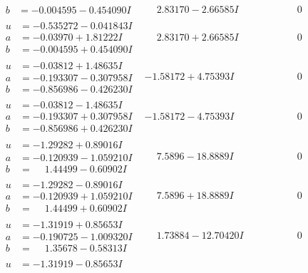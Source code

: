 \documentclass[1p]{elsarticle_modified}
\theoremstyle{definition}
\begin{document}
$$\begin{array}{c|c|c}
\begin{aligned}
b &= -0.004595 - 0.454090 I\end{aligned}
 & \phantom{-}2.83170 - 2.66585 I & \phantom{-0.000000 } 0 \\ \hline\begin{aligned}
u &= -0.535272 - 0.041843 I \\
a &= -0.03970 + 1.81222 I \\
b &= -0.004595 + 0.454090 I\end{aligned}
 & \phantom{-}2.83170 + 2.66585 I & \phantom{-0.000000 } 0 \\ \hline\begin{aligned}
u &= -0.03812 + 1.48635 I \\
a &= -0.193307 - 0.307958 I \\
b &= -0.856986 - 0.426230 I\end{aligned}
 & -1.58172 + 4.75393 I & \phantom{-0.000000 } 0 \\ \hline\begin{aligned}
u &= -0.03812 - 1.48635 I \\
a &= -0.193307 + 0.307958 I \\
b &= -0.856986 + 0.426230 I\end{aligned}
 & -1.58172 - 4.75393 I & \phantom{-0.000000 } 0 \\ \hline\begin{aligned}
u &= -1.29282 + 0.89016 I \\
a &= -0.120939 - 1.059210 I \\
b &= \phantom{-}1.44499 - 0.60902 I\end{aligned}
 & \phantom{-}7.5896 - 18.8889 I & \phantom{-0.000000 } 0 \\ \hline\begin{aligned}
u &= -1.29282 - 0.89016 I \\
a &= -0.120939 + 1.059210 I \\
b &= \phantom{-}1.44499 + 0.60902 I\end{aligned}
 & \phantom{-}7.5896 + 18.8889 I & \phantom{-0.000000 } 0 \\ \hline\begin{aligned}
u &= -1.31919 + 0.85653 I \\
a &= -0.190725 - 1.009320 I \\
b &= \phantom{-}1.35678 - 0.58313 I\end{aligned}
 & \phantom{-}1.73884 - 12.70420 I & \phantom{-0.000000 } 0 \\ \hline\begin{aligned}
u &= -1.31919 - 0.85653 I \\

\end{aligned}
\end{array}$$
\end{document}

